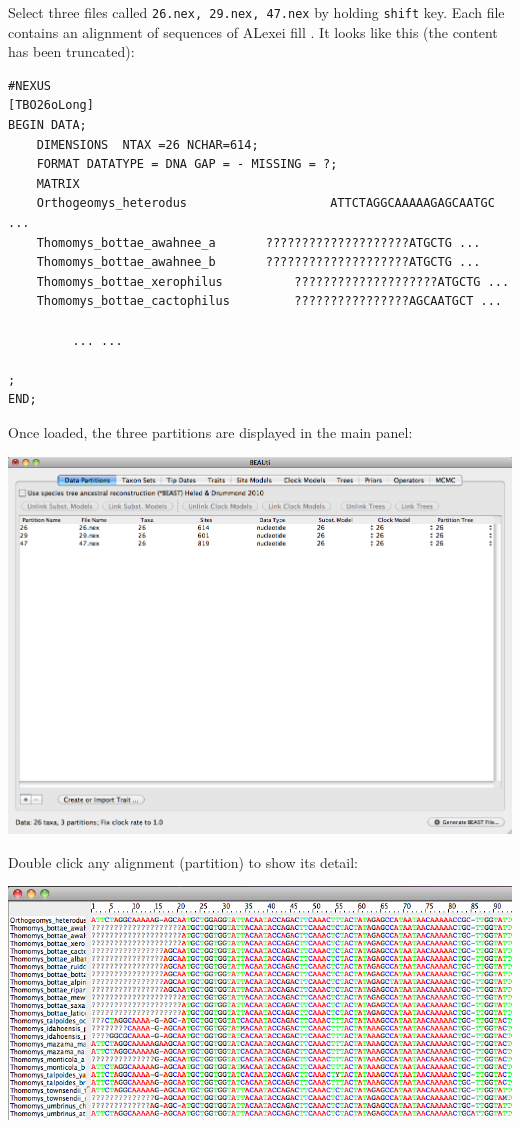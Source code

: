 \documentclass[12pt]{article}
\begin{document}
\medskip{}

Select three files called \texttt{26.nex, 29.nex, 47.nex} by holding \texttt{shift} key. Each file contains an alignment of sequences of          ALexei fill            . It looks like this (the content has been truncated):

\begin{verbatim}
#NEXUS
[TBO26oLong]
BEGIN DATA;
	DIMENSIONS  NTAX =26 NCHAR=614;
	FORMAT DATATYPE = DNA GAP = - MISSING = ?;
	MATRIX	
	Orthogeomys_heterodus   		         ATTCTAGGCAAAAAGAGCAATGC ...
	Thomomys_bottae_awahnee_a 		????????????????????ATGCTG ...
	Thomomys_bottae_awahnee_b  		????????????????????ATGCTG ...
	Thomomys_bottae_xerophilus  		????????????????????ATGCTG ...
	Thomomys_bottae_cactophilus  		????????????????AGCAATGCT ...

         ... ...

;
END;
\end{verbatim}

\medskip{}

Once loaded, the three partitions are displayed in the main panel:

\medskip{}

\includegraphics[scale=0.4]{figures/BEAUti_DataPartitions}

\medskip{}

Double click any alignment (partition) to show its detail:

\medskip{}

\includegraphics[scale=0.4]{figures/BEAUti_ShowAlignment}
\end{document}
